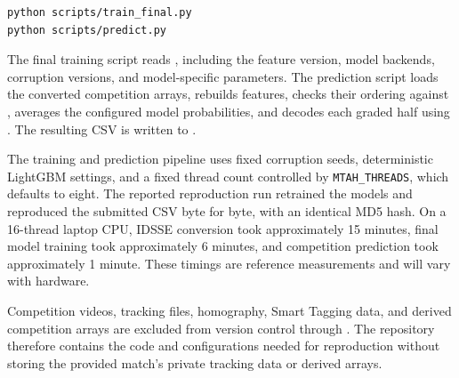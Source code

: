 \documentclass[11pt,a4paper]{article}
\begin{document}
\begin{lstlisting}[style=terminal]
python scripts/train_final.py
python scripts/predict.py
\end{lstlisting}

The final training script reads , including the feature version, model backends, corruption versions, and model-specific parameters. The prediction script loads the converted competition arrays, rebuilds features, checks their ordering against , averages the configured model probabilities, and decodes each graded half using . The resulting CSV is written to .

The training and prediction pipeline uses fixed corruption seeds, deterministic LightGBM settings, and a fixed thread count controlled by \texttt{MTAH\_THREADS}, which defaults to eight. The reported reproduction run retrained the models and reproduced the submitted CSV byte for byte, with an identical MD5 hash. On a 16-thread laptop CPU, IDSSE conversion took approximately 15 minutes, final model training took approximately 6 minutes, and competition prediction took approximately 1 minute. These timings are reference measurements and will vary with hardware.

Competition videos, tracking files, homography, Smart Tagging data, and derived competition arrays are excluded from version control through . The repository therefore contains the code and configurations needed for reproduction without storing the provided match's private tracking data or derived arrays.
\end{document}
